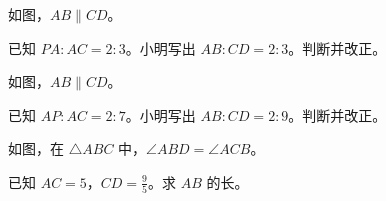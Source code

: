 \documentclass{exam-zh}
\begin{document}

\begin{problem}[points=10]
  \noindent
  \begin{minipage}[t]{\dimexpr\linewidth-60mm-6mm\relax}
    \vspace{0pt}
    如图，$AB\parallel CD$。

已知 $PA:AC=2:3$。小明写出 $AB:CD=2:3$。判断并改正。
    
  \end{minipage}\hfill
  \begin{diagramcoltikz}{60mm}{}
  }
  \end{diagramcoltikz}
  \par\medskip
  \answerarea[48mm]
\end{problem}



\begin{problem}[points=10]
  \noindent
  \begin{minipage}[t]{\dimexpr\linewidth-60mm-6mm\relax}
    \vspace{0pt}
    如图，$AB\parallel CD$。

已知 $AP:AC=2:7$。小明写出 $AB:CD=2:9$。判断并改正。
    
  \end{minipage}\hfill
  \begin{diagramcoltikz}{60mm}{}
  }
  \end{diagramcoltikz}
  \par\medskip
  \answerarea[48mm]
\end{problem}



\begin{problem}[points=10]
  \noindent
  \begin{minipage}[t]{\dimexpr\linewidth-60mm-6mm\relax}
    \vspace{0pt}
    如图，在 $\triangle ABC$ 中，$\angle ABD=\angle ACB$。

已知 $AC=5$，$CD=\frac{9}{5}$。求 $AB$ 的长。
    
  \end{minipage}\hfill
  \begin{diagramcoltikz}{60mm}{}
  }
  \end{diagramcoltikz}
  \par\medskip
  \answerarea[54mm]
\end{problem}
\end{document}
